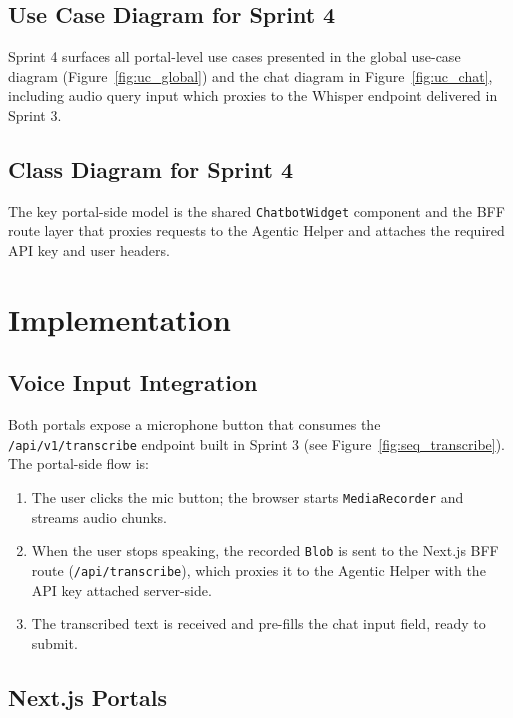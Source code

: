 \subsection{Use Case Diagram for Sprint 4}

Sprint 4 surfaces all portal-level use cases presented in the global use-case diagram
(Figure~\ref{fig:uc_global}) and the chat diagram in Figure~\ref{fig:uc_chat}, including audio
query input which proxies to the Whisper endpoint delivered in Sprint 3.

\subsection{Class Diagram for Sprint 4}

The key portal-side model is the shared \texttt{ChatbotWidget} component and the BFF route layer
that proxies requests to the Agentic Helper and attaches the required API key and user headers.

\section{Implementation}

\subsection{Voice Input Integration}

Both portals expose a microphone button that consumes the \texttt{/api/v1/transcribe} endpoint
built in Sprint 3 (see Figure~\ref{fig:seq_transcribe}). The portal-side flow is:

\begin{enumerate}
  \item The user clicks the mic button; the browser starts \texttt{MediaRecorder} and streams
    audio chunks.
  \item When the user stops speaking, the recorded \texttt{Blob} is sent to the Next.js BFF
    route (\texttt{/api/transcribe}), which proxies it to the Agentic Helper with the API key
    attached server-side.
  \item The transcribed text is received and pre-fills the chat input field, ready to submit.
\end{enumerate}

\subsection{Next.js Portals}


